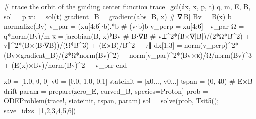 \documentclass[
  a4paper,
  DIV=11]{scrreprt}
\newenvironment{Shaded}{\begin{snugshade}}{\end{snugshade}}
\newcommand{\CommentTok}[1]{\textcolor[rgb]{0.37,0.37,0.37}{#1}}
\newcommand{\FloatTok}[1]{\textcolor[rgb]{0.68,0.00,0.00}{#1}}
\newcommand{\FunctionTok}[1]{\textcolor[rgb]{0.28,0.35,0.67}{#1}}
\newcommand{\KeywordTok}[1]{\textcolor[rgb]{0.00,0.23,0.31}{#1}}
\newcommand{\NormalTok}[1]{\textcolor[rgb]{0.00,0.23,0.31}{#1}}
\newcommand{\OperatorTok}[1]{\textcolor[rgb]{0.37,0.37,0.37}{#1}}
\begin{document}
\begin{Shaded}
\begin{Highlighting}[]
\CommentTok{\# trace the orbit of the guiding center}
\KeywordTok{function} \FunctionTok{trace\_gc!}\NormalTok{(dx, x, p, t)}
\NormalTok{    q, m, E, B, sol }\OperatorTok{=}\NormalTok{ p}
\NormalTok{    xu }\OperatorTok{=} \FunctionTok{sol}\NormalTok{(t)}
\NormalTok{    gradient\_B }\OperatorTok{=} \FunctionTok{gradient}\NormalTok{(abs\_B, x)  }\CommentTok{\# ∇|B|}
\NormalTok{    Bv }\OperatorTok{=} \FunctionTok{B}\NormalTok{(x)}
\NormalTok{    b }\OperatorTok{=} \FunctionTok{normalize}\NormalTok{(Bv)}
\NormalTok{    v\_par }\OperatorTok{=}\NormalTok{ (xu[}\FloatTok{4}\OperatorTok{:}\FloatTok{6}\NormalTok{]}\OperatorTok{⋅}\NormalTok{b)}\OperatorTok{.*}\NormalTok{b  }\CommentTok{\# (v⋅b)b}
\NormalTok{    v\_perp }\OperatorTok{=}\NormalTok{ xu[}\FloatTok{4}\OperatorTok{:}\FloatTok{6}\NormalTok{] }\OperatorTok{{-}}\NormalTok{ v\_par}
\NormalTok{    Ω }\OperatorTok{=} \FunctionTok{q*norm}\NormalTok{(Bv)}\OperatorTok{/}\NormalTok{m}
\NormalTok{    κ }\OperatorTok{=} \FunctionTok{jacobian}\NormalTok{(B, x)}\OperatorTok{*}\NormalTok{Bv  }\CommentTok{\# B⋅∇B}
    \CommentTok{\# v⟂\^{}2*(B×∇|B|)/(2*Ω*B\^{}2) + v∥\^{}2*(B×(B⋅∇B))/(Ω*B\^{}3) + (E×B)/B\^{}2 + v∥}
\NormalTok{    dx[}\FloatTok{1}\OperatorTok{:}\FloatTok{3}\NormalTok{] }\OperatorTok{=} \FunctionTok{norm}\NormalTok{(v\_perp)}\OperatorTok{\^{}}\FloatTok{2}\FunctionTok{*}\NormalTok{(Bv}\OperatorTok{×}\NormalTok{gradient\_B)}\OperatorTok{/}\NormalTok{(}\FloatTok{2}\FunctionTok{*Ω*norm}\NormalTok{(Bv)}\OperatorTok{\^{}}\FloatTok{2}\NormalTok{) }\OperatorTok{+} 
                \FunctionTok{norm}\NormalTok{(v\_par)}\OperatorTok{\^{}}\FloatTok{2}\FunctionTok{*}\NormalTok{(Bv}\OperatorTok{×}\NormalTok{κ)}\OperatorTok{/}\NormalTok{Ω}\OperatorTok{/}\FunctionTok{norm}\NormalTok{(Bv)}\OperatorTok{\^{}}\FloatTok{3} \OperatorTok{+}\NormalTok{ (}\FunctionTok{E}\NormalTok{(x)}\OperatorTok{×}\NormalTok{Bv)}\OperatorTok{/}\FunctionTok{norm}\NormalTok{(Bv)}\OperatorTok{\^{}}\FloatTok{2} \OperatorTok{+}\NormalTok{ v\_par}
\KeywordTok{end}

\NormalTok{x0 }\OperatorTok{=}\NormalTok{ [}\FloatTok{1.0}\NormalTok{, }\FloatTok{0}\NormalTok{, }\FloatTok{0}\NormalTok{]}
\NormalTok{v0 }\OperatorTok{=}\NormalTok{ [}\FloatTok{0.0}\NormalTok{, }\FloatTok{1.0}\NormalTok{, }\FloatTok{0.1}\NormalTok{]}
\NormalTok{stateinit }\OperatorTok{=}\NormalTok{ [x0}\OperatorTok{...}\NormalTok{, v0}\OperatorTok{...}\NormalTok{]}
\NormalTok{tspan }\OperatorTok{=}\NormalTok{ (}\FloatTok{0}\NormalTok{, }\FloatTok{40}\NormalTok{)}
\CommentTok{\# E×B drift}
\NormalTok{param }\OperatorTok{=} \FunctionTok{prepare}\NormalTok{(zero\_E, curved\_B, species}\OperatorTok{=}\NormalTok{Proton)}
\NormalTok{prob }\OperatorTok{=} \FunctionTok{ODEProblem}\NormalTok{(trace!, stateinit, tspan, param)}
\NormalTok{sol }\OperatorTok{=} \FunctionTok{solve}\NormalTok{(prob, }\FunctionTok{Tsit5}\NormalTok{(); save\_idxs}\OperatorTok{=}\NormalTok{[}\FloatTok{1}\NormalTok{,}\FloatTok{2}\NormalTok{,}\FloatTok{3}\NormalTok{,}\FloatTok{4}\NormalTok{,}\FloatTok{5}\NormalTok{,}\FloatTok{6}\NormalTok{])}


\end{Highlighting}
\end{Shaded}
\end{document}
